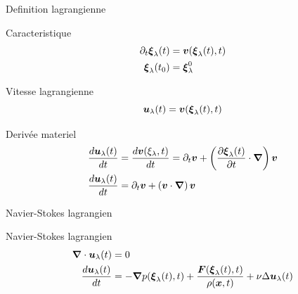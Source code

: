 \begin{frame}[<+->]{Definition lagrangienne}
 \begin{block}{Caracteristique}
\begin{align*}
 \partial_t {\boldsymbol {\xi}}_{\lambda}(t)&={\boldsymbol {v}}({\boldsymbol {\xi}}_{\lambda}(t),t)\\
 {\boldsymbol {\xi}}_{\lambda}(t_0)&={\boldsymbol {\xi}}^{0}_{\lambda}
\end{align*}
\end{block}

\begin{block}{Vitesse lagrangienne}
\begin{equation*}
 {\boldsymbol {u}}_{\lambda}(t)={\boldsymbol {v}}({\boldsymbol {\xi}}_{\lambda}(t),t)
\end{equation*}
\end{block}

\begin{block}{Derivée materiel}
\begin{align*}
\frac{d {\boldsymbol {u}}_{\lambda}(t)}{d t}&=\frac{d {\boldsymbol {v}}(\xi_{\lambda},t)}{d t}=\partial_t {\boldsymbol {v}}+\left(\frac{\partial {\boldsymbol {\xi}}_{\lambda}(t)}{\partial t}\cdot{\boldsymbol {\nabla}}\right){\boldsymbol {v}}\\
\frac{d {\boldsymbol {u}}_{\lambda}(t)}{d t}&=\partial_t {\boldsymbol {v}}+\left({\boldsymbol {v}} \cdot{\boldsymbol {\nabla}}\right){\boldsymbol {v}}
\end{align*}
 \end{block}

\end{frame}
\begin{frame}{Navier-Stokes lagrangien}
 \begin{block}{Navier-Stokes lagrangien}
 \begin{align*}
{\boldsymbol {\nabla}} \cdot {\boldsymbol {u}}_{\lambda}(t)&=0\\
\frac{d {\boldsymbol {u}}_{\lambda}(t)}{d t}&=-{\boldsymbol {\nabla}} p({\boldsymbol {\xi}}_{\lambda}(t),t)+\frac{{\boldsymbol {F}}({\boldsymbol {\xi}}_{\lambda}(t),t)}{\rho({\boldsymbol {x}},t)}+\nu \Delta {\boldsymbol {u}}_{\lambda}(t)
 \end{align*}
 \end{block}

\end{frame}


